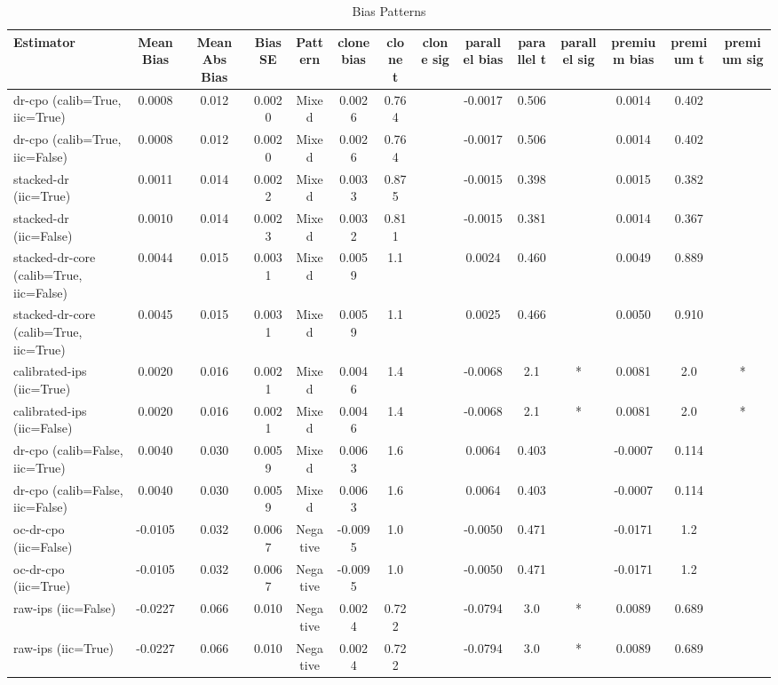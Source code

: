 \begin{table}[htbp]
\centering
\caption{Bias Patterns}
\label{tab:A2}
\begin{tabular}{l|ccccccccccccc}
\toprule
Estimator & Mean Bias & Mean Abs Bias & Bias SE & Pattern & clone bias & clone t & clone sig & parallel bias & parallel t & parallel sig & premium bias & premium t & premium sig \\
\midrule
dr-cpo (calib=True, iic=True) & 0.0008 & 0.012 & 0.0020 & Mixed & 0.0026 & 0.764 &  & -0.0017 & 0.506 &  & 0.0014 & 0.402 &  \\
dr-cpo (calib=True, iic=False) & 0.0008 & 0.012 & 0.0020 & Mixed & 0.0026 & 0.764 &  & -0.0017 & 0.506 &  & 0.0014 & 0.402 &  \\
stacked-dr (iic=True) & 0.0011 & 0.014 & 0.0022 & Mixed & 0.0033 & 0.875 &  & -0.0015 & 0.398 &  & 0.0015 & 0.382 &  \\
stacked-dr (iic=False) & 0.0010 & 0.014 & 0.0023 & Mixed & 0.0032 & 0.811 &  & -0.0015 & 0.381 &  & 0.0014 & 0.367 &  \\
stacked-dr-core (calib=True, iic=False) & 0.0044 & 0.015 & 0.0031 & Mixed & 0.0059 & 1.1 &  & 0.0024 & 0.460 &  & 0.0049 & 0.889 &  \\
stacked-dr-core (calib=True, iic=True) & 0.0045 & 0.015 & 0.0031 & Mixed & 0.0059 & 1.1 &  & 0.0025 & 0.466 &  & 0.0050 & 0.910 &  \\
calibrated-ips (iic=True) & 0.0020 & 0.016 & 0.0021 & Mixed & 0.0046 & 1.4 &  & -0.0068 & 2.1 & * & 0.0081 & 2.0 & * \\
calibrated-ips (iic=False) & 0.0020 & 0.016 & 0.0021 & Mixed & 0.0046 & 1.4 &  & -0.0068 & 2.1 & * & 0.0081 & 2.0 & * \\
dr-cpo (calib=False, iic=True) & 0.0040 & 0.030 & 0.0059 & Mixed & 0.0063 & 1.6 &  & 0.0064 & 0.403 &  & -0.0007 & 0.114 &  \\
dr-cpo (calib=False, iic=False) & 0.0040 & 0.030 & 0.0059 & Mixed & 0.0063 & 1.6 &  & 0.0064 & 0.403 &  & -0.0007 & 0.114 &  \\
oc-dr-cpo (iic=False) & -0.0105 & 0.032 & 0.0067 & Negative & -0.0095 & 1.0 &  & -0.0050 & 0.471 &  & -0.0171 & 1.2 &  \\
oc-dr-cpo (iic=True) & -0.0105 & 0.032 & 0.0067 & Negative & -0.0095 & 1.0 &  & -0.0050 & 0.471 &  & -0.0171 & 1.2 &  \\
raw-ips (iic=False) & -0.0227 & 0.066 & 0.010 & Negative & 0.0024 & 0.722 &  & -0.0794 & 3.0 & * & 0.0089 & 0.689 &  \\
raw-ips (iic=True) & -0.0227 & 0.066 & 0.010 & Negative & 0.0024 & 0.722 &  & -0.0794 & 3.0 & * & 0.0089 & 0.689 &  \\

\end{tabular}
\end{table}
